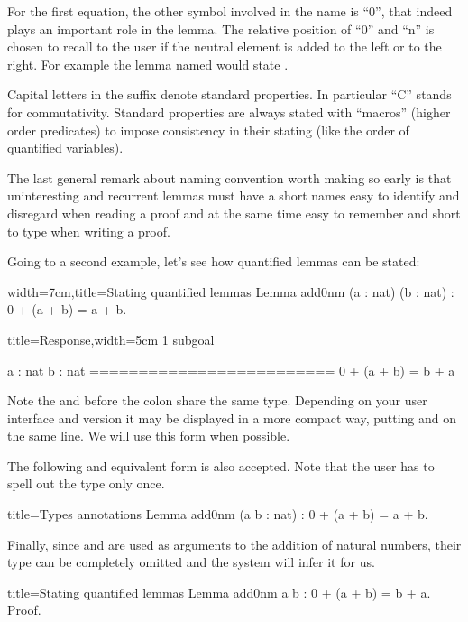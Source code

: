For the first equation, the other symbol involved in the name is ``0'',
that indeed plays an important role in the lemma.  The relative position
of ``0'' and ``n'' is chosen to recall to the user if the neutral element
is added to the left or to the right.  For example the lemma named
 would state .

Capital letters in the suffix denote standard properties.
In particular ``C'' stands for commutativity.  Standard properties are
always stated with ``macros'' (higher order predicates) to impose
consistency in their stating (like the order of quantified variables).

The last general remark about naming convention worth making so early is that
uninteresting and recurrent lemmas must have a short names easy to identify and
disregard when reading a proof and at the same time easy to remember and short
to type when writing a proof.

Going to a second example, let's see how quantified lemmas can be stated:

\begin{coq}{width=7cm,title=Stating quantified lemmas}
Lemma add0nm (a : nat) (b : nat) :
  0 + (a + b) = a + b.
\end{coq}
\begin{coqout}{title=Response,width=5cm}
1 subgoal

 a : nat
 b : nat
 =========================
  0 + (a + b) = b + a
\end{coqout}

Note the  and  before the colon share the same type.
Depending on your user interface and \Coq{} version it may be displayed
in a more compact way, putting   and  on the same line.
We will use this form when possible.

The following and equivalent form is also accepted.  Note that
the user has to spell out the type only once.

\begin{coq}{title=Types annotations}
Lemma add0nm (a b : nat) : 0 + (a + b) = a + b.
\end{coq}

Finally, since  and  are used as arguments to
the addition of natural numbers, their type can be completely
omitted and the system will infer it for us.

\begin{coq}{title=Stating quantified lemmas}
Lemma add0nm a b : 0 + (a + b) = b + a.
Proof.
\end{coq}

